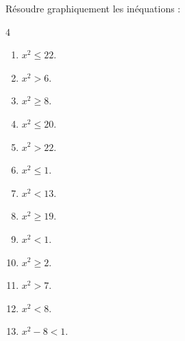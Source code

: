 {%
\begin{Exercice}%
Résoudre graphiquement les inéquations :
\begin{multicols}{4}
\begin{enumerate}[itemsep=1.5em]
	\item \begin{minipage}[t]{\linewidth} $x^2 \leqslant 22$.\end{minipage}
	\item \begin{minipage}[t]{\linewidth} $x^2>6$.\end{minipage}
	\item \begin{minipage}[t]{\linewidth} $x^2 \geqslant 8$.\end{minipage}
	\item \begin{minipage}[t]{\linewidth} $x^2 \leqslant 20$.\end{minipage}
	\item \begin{minipage}[t]{\linewidth} $x^2>22$.\end{minipage}
	\item \begin{minipage}[t]{\linewidth} $x^2 \leqslant 1$.\end{minipage}
	\item \begin{minipage}[t]{\linewidth} $x^2<13$.\end{minipage}
	\item \begin{minipage}[t]{\linewidth} $x^2 \geqslant 19$.\end{minipage}
	\item \begin{minipage}[t]{\linewidth} $x^2<1$.\end{minipage}
	\item \begin{minipage}[t]{\linewidth} $x^2 \geqslant 2$.\end{minipage}
	\item \begin{minipage}[t]{\linewidth} $x^2>7$.\end{minipage}
	\item \begin{minipage}[t]{\linewidth} $x^2<8$.\end{minipage}
	\item \begin{minipage}[t]{\linewidth} $x^2-8<1$.\end{minipage}

\end{enumerate}
\end{multicols}
\end{Exercice}}
